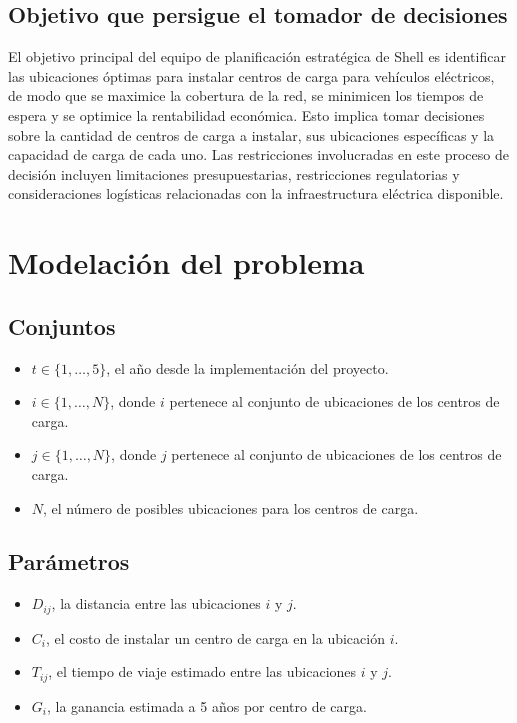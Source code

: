 \documentclass[letterpaper]{article}
\begin{document}
\begin{flushleft}
		\subsection{Objetivo que persigue el tomador de decisiones}
		El objetivo principal del equipo de planificación estratégica de Shell es identificar las ubicaciones óptimas para instalar centros de carga para vehículos eléctricos, de modo que se maximice la cobertura de la red, se minimicen los tiempos de espera y se optimice la rentabilidad económica. Esto implica tomar decisiones sobre la cantidad de centros de carga a instalar, sus ubicaciones específicas y la capacidad de carga de cada uno. Las restricciones involucradas en este proceso de decisión incluyen limitaciones presupuestarias, restricciones regulatorias y consideraciones logísticas relacionadas con la infraestructura eléctrica disponible. 
		
		\section{Modelación del problema}
		\subsection{Conjuntos}
		\begin{itemize}
			\item $t \in \{1, \ldots, 5\}$, el año desde la implementación del proyecto.
			\item $i \in \{1, \ldots, N\}$, donde $i$ pertenece al conjunto de ubicaciones de los centros de carga.
			\item $j \in \{1, \ldots, N\}$, donde $j$ pertenece al conjunto de ubicaciones de los centros de carga.
			\item $N$, el número de posibles ubicaciones para los centros de carga.
		\end{itemize}
		
		\subsection{Parámetros}
		\begin{itemize}
			\item $D_{ij}$, la distancia entre las ubicaciones $i$ y $j$.
			\item $C_i$, el costo de instalar un centro de carga en la ubicación $i$.
			\item $T_{ij}$, el tiempo de viaje estimado entre las ubicaciones $i$ y $j$.
			\item $G_i$, la ganancia estimada a 5 años por centro de carga.
		\end{itemize}

\end{flushleft}
\end{document}
